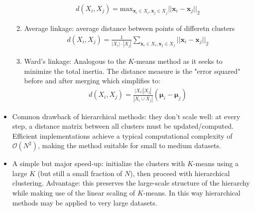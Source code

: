 \documentclass[norsk,a4paper,11pt]{article}
\begin{document}
\begin{itemize}
\begin{enumerate}
		\begin{align}
			d(X_i, X_j) = \text{max}_{\bm{x}_i \in X_i, \bm{x}_j \in X_j} ||\bm{x}_i -\bm{x}_j||_2
		\end{align}
		\item Average linkage: average distance between points of differetn clusters
		\begin{align}
			d(X_i, X_j) = \frac{1}{|X_i|\cdot |X_j|} \sum_{\bm{x}_i \in X_i, \bm{x}_j \in X_j} ||\bm{x}_i -\bm{x}_j||_2
		\end{align}
		\item Ward's linkage: Analogous to the $K$-means method as it seeks to minimize the total inertia. The distance measure is the "error squared" before and after merging which simplifies to:
		\begin{align}
			d(X_i, X_j) = \frac{|X_i||X_j|}{|X_i \cup X_j|} (\bm{\mu}_i - \bm{\mu}_j)
		\end{align}
	\end{enumerate}
	\item Common drawback of hierarchical methods: they don't scale well: at every step, a distance matrix between all clusters must be updated/computed. Efficient implementations achieve a typical computational complexity of $\mathcal{O}(N^2)$, making the method suitable for small to medium datasets.
	\item A simple but major speed-up: initialize the clusters with $K$-means using a large $K$ (but still a small fraction of $N$), then proceed with hierarchical clustering. Advantage: this preserves the large-scale structure of the hierarchy while making use of the linear scaling of $K$-means. In this way hierarchical methods may be applied to very large datasets.
\end{itemize}
\end{document}
